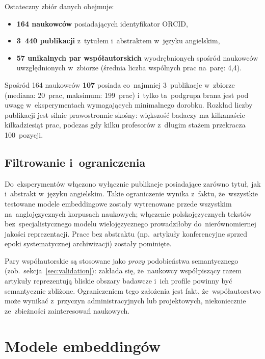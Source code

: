 Ostateczny zbiór danych obejmuje:
\begin{itemize}
    \item \textbf{164 naukowców} posiadających identyfikator ORCID,
    \item \textbf{3~440 publikacji} z~tytułem i~abstraktem w~języku angielskim,
    \item \textbf{57 unikalnych par współautorskich} wyodrębnionych spośród
          naukowców uwzględnionych w~zbiorze
          (średnia liczba wspólnych prac na~parę: 4{,}4).
\end{itemize}

Spośród 164 naukowców \textbf{107} posiada co~najmniej 3~publikacje
w~zbiorze (mediana: 20~prac, maksimum: 199~prac) i~tylko ta~podgrupa
brana jest pod uwagę w~eksperymentach wymagających minimalnego dorobku.
Rozkład liczby publikacji jest silnie prawostronnie skośny:
większość badaczy ma kilkanaście–kilkadziesiąt prac,
podczas gdy kilku profesorów z~długim stażem przekracza 100~pozycji.

\subsection{Filtrowanie i~ograniczenia}

Do~eksperymentów włączono wyłącznie publikacje posiadające zarówno
tytuł, jak i~abstrakt w~języku angielskim.
Takie ograniczenie wynika z~faktu, że~wszystkie testowane modele
embeddingowe zostały wytrenowane przede wszystkim na~anglojęzycznych
korpusach naukowych; włączenie polskojęzycznych tekstów
bez~specjalistycznego modelu wielojęzycznego prowadziłoby
do~nierównomiernej jakości reprezentacji.
Prace bez abstraktu (np.\ artykuły konferencyjne sprzed epoki
systematycznej archiwizacji) zostały pominięte.

Pary współautorskie są stosowane jako \emph{proxy} podobieństwa
semantycznego (zob.\ sekcja~\ref{sec:validation}): zakłada się,
że~naukowcy współpiszący razem artykuły reprezentują bliskie obszary
badawcze i~ich profile powinny być semantycznie zbliżone.
Ograniczeniem tego założenia jest fakt, że~współautorstwo może
wynikać z~przyczyn administracyjnych lub projektowych,
niekoniecznie ze~zbieżności zainteresowań naukowych.

\section{Modele embeddingów}
\label{sec:models}

